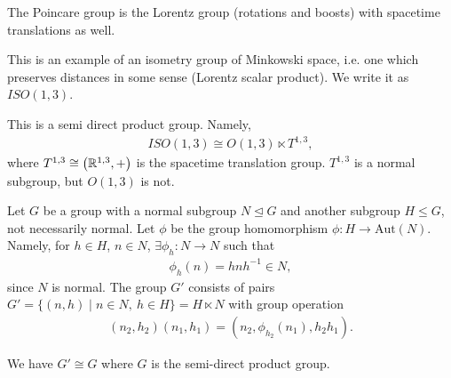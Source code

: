 
The Poincare group is the Lorentz group (rotations and boosts) with spacetime translations as well.

This is an example of an isometry group of Minkowski space, i.e. one which preserves distances in some sense (Lorentz scalar product). We write it as $ISO \left( 1,3 \right) $.

This is a semi direct product group. Namely,
\begin{align}
    ISO \left( 1,3 \right) \cong O \left( 1,3 \right) \ltimes T^{1,3}
,\end{align}
where $T^{1,3} \cong \left( \mathbb{R}^{1,3}, + \right) $ is the spacetime translation group. $T^{1,3}$  is a normal subgroup, but $O\left( 1,3 \right) $ is not.

Let $G$ be a group with a normal subgroup $N \trianglelefteq G$ and another subgroup $H \leq G$, not necessarily normal. Let $\phi$ be the group homomorphism $\phi : H \to \text{Aut}\left( N \right) $. Namely, for $h \in H$, $n \in N$, $\exists \phi_h : N \to N$ such that
\begin{align}
    \phi_h \left( n \right)  = h n h^{-1} \in N
,\end{align}
since $N$ is normal. The group $G'$ consists of pairs $G' = \{\left( n,h \right)  \mid n \in N,~ h \in H\} = H \ltimes N$ with group operation
\begin{align}
    \left( n_2, h_2 \right) \left( n_1,h_1 \right) = \left( n_2, \phi_{h_2}\left( n_1 \right), h_2 h_1  \right) 
.\end{align}

We have $G' \cong G$ where $G$ is the semi-direct product group.

